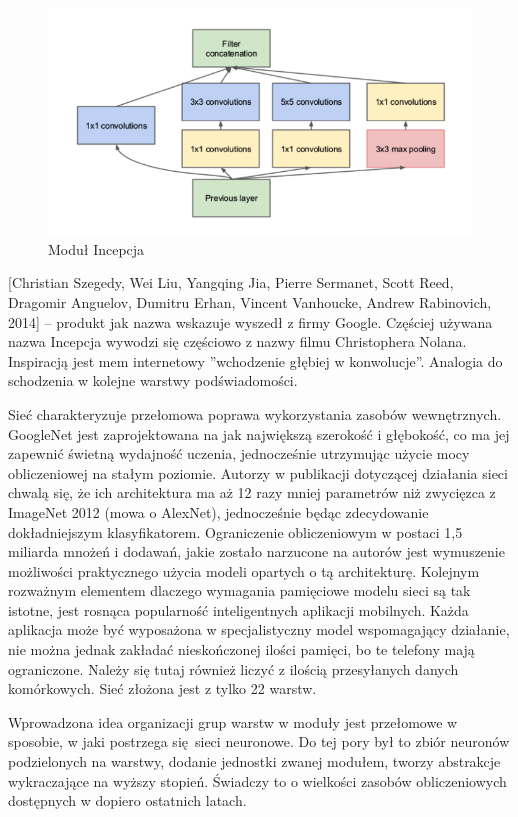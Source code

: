 \documentclass[12pt,a4paper,twoside,titlepage,openright]{book}
\begin{document}
\begin{figure}[ht]
	\centering
			\includegraphics[resolution=100, scale=0.7]{inceptionModule.png}
		\caption{Moduł Incepcja}
\end{figure}

[Christian Szegedy, Wei Liu, Yangqing Jia, Pierre Sermanet, Scott Reed, Dragomir Anguelov, Dumitru Erhan, Vincent Vanhoucke, Andrew Rabinovich, 2014] -- produkt jak nazwa wskazuje wyszedł z firmy Google. Częściej używana nazwa Incepcja wywodzi się częściowo z nazwy filmu Christophera Nolana. Inspiracją jest mem internetowy ''wchodzenie głębiej w konwolucje''. Analogia do schodzenia w kolejne warstwy podświadomości.\cite{siteDeeper}

Sieć charakteryzuje przełomowa poprawa wykorzystania zasobów wewnętrznych. GoogleNet jest zaprojektowana na jak największą szerokość i głębokość, co ma jej zapewnić świetną wydajność uczenia, jednocześnie utrzymując użycie mocy obliczeniowej na stałym poziomie. Autorzy w publikacji dotyczącej działania sieci chwalą się, że ich architektura ma aż 12 razy mniej parametrów niż zwycięzca z ImageNet 2012 (mowa o AlexNet), jednocześnie będąc zdecydowanie dokładniejszym klasyfikatorem. Ograniczenie obliczeniowym w postaci 1,5 miliarda mnożeń i dodawań, jakie zostało narzucone na autorów jest wymuszenie możliwości praktycznego użycia modeli opartych o tą architekturę. Kolejnym rozważnym elementem dlaczego wymagania pamięciowe modelu sieci są tak istotne, jest rosnąca popularność inteligentnych aplikacji mobilnych. Każda aplikacja może być wyposażona w specjalistyczny model wspomagający działanie, nie można jednak zakładać nieskończonej ilości pamięci, bo te telefony mają ograniczone. Należy się tutaj również liczyć z ilością przesyłanych danych komórkowych. Sieć złożona jest z tylko 22 warstw.

Wprowadzona idea organizacji grup warstw w moduły jest przełomowe w sposobie, w jaki postrzega się sieci neuronowe. Do tej pory był to zbiór neuronów podzielonych na warstwy, dodanie jednostki zwanej modułem, tworzy abstrakcje wykraczające na wyższy stopień. Świadczy to o wielkości zasobów obliczeniowych dostępnych w dopiero ostatnich latach.
\end{document}
